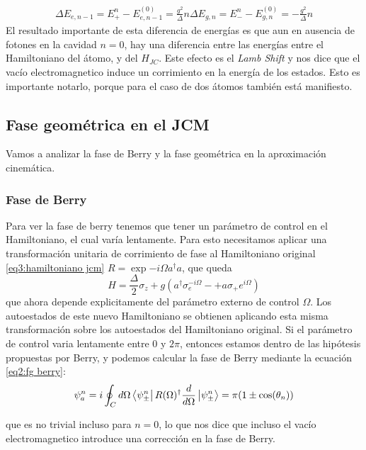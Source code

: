 \begin{equation}
    \begin{aligned}
        \Delta E_{e,n-1}=E_+^n-E^{(0)}_{e,n-1}=\frac{g^2}{\Delta}n
        \Delta E_{g,n}=E_-^n-E^{(0)}_{g,n}=-\frac{g^2}{\Delta}n
    \end{aligned}
\end{equation}
El resultado importante de esta diferencia de energías es que aun en ausencia de fotones en la cavidad $n=0$, hay una diferencia entre las energías entre el Hamiltoniano del átomo, y del $H_{JC}$. Este efecto es el \textit{Lamb Shift} y nos dice que el vac\'io electromagnetico induce un corrimiento en la energ\'ia de los estados. Esto es importante notarlo, porque para el caso de dos átomos también est\'a manifiesto.

\subsection{Fase geométrica en el JCM}
Vamos a analizar la fase de Berry y la fase geométrica en la aproximación cinemática.
\subsubsection{Fase de Berry}
Para ver la fase de berry tenemos que tener un parámetro de control en el Hamiltoniano, el cual varía lentamente. Para esto necesitamos aplicar una transformación unitaria de corrimiento de fase al Hamiltoniano original \ref{eq3:hamiltoniano jcm} $R=\exp{-i\Omega a^\dagger a}$, que queda
\begin{equation}
    H=\frac{\Delta}{2}\sigma_z+g(a^\dagger \sigma_e^{-i\Omega}-+a\sigma_+e^{i\Omega})
\end{equation}
que ahora depende explicitamente del parámetro externo de control $\Omega$. Los autoestados de este nuevo Hamiltoniano se obtienen aplicando esta misma transformación sobre los autoestados del Hamiltoniano original. Si el parámetro de control varia lentamente entre 0 y $2\pi$, entonces estamos dentro de las hipótesis propuestas por Berry, y podemos calcular la fase de Berry mediante la ecuación \ref{eq2:fg berry}:
\begin{equation}
    \psi_a^n=i\oint_Cd\Omega\bra{\psi_\pm^n}R(\Omega)^\dagger \frac{d}{d\Omega}\ket{\psi_\pm^n}=\pi(1\pm \cos(\theta_n))
\end{equation}

que es no trivial incluso para $n=0$, lo que nos dice que incluso el vacío electromagnetico introduce una corrección en la fase de Berry.

